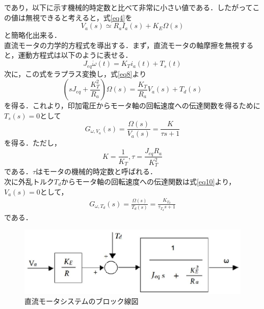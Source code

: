 \documentclass[11pt,a4paper]{jsarticle}
\begin{document}
  であり，以下に示す機械的時定数と比べて非常に小さい値である．したがってこの値は無視できると考えると，式\ref{eq4}を
  \begin{equation}
   V_a(s) \simeq R_a I_a(s) + K_E \Omega(s)
    \label{eq8}
  \end{equation}
  と簡略化出来る．\\
  直流モータの力学的方程式を導出する．まず，直流モータの軸摩擦を無視すると，運動方程式は以下のように表せる．
  \begin{equation}
   J_{eq} \dot{\omega}(t) = K_T i_a(t) + T_s(t) 
    \label{eq9}
  \end{equation}
  次に，この式をラプラス変換し，式\ref{eq8}より
  \begin{equation}
   (sJ_{eq} + \frac{K_T^2}{R_a})\Omega(s) = \frac{K_T}{R_a} V_a(s) + T_d(s)
    \label{eq10}
  \end{equation}
  を得る．これより，印加電圧からモータ軸の回転速度への伝達関数を得るために$T_s(s) = 0$として
  \begin{equation}
   G_{\omega , V_a}(s) = \frac{\Omega(s)}{V_a(s)} = \frac{K}{\tau s+1}
    \label{eq11}
  \end{equation}
  を得る．ただし，
  \begin{equation}
   K = \frac{1}{K_T} , \tau = \frac{J_{eq} R_a}{K_T^2}
    \label{eq12}
  \end{equation}
  である．$\tau$はモータの機械的時定数と呼ばれる．\\
  次に外乱トルク$T_d$からモータ軸の回転速度への伝達関数は式\ref{eq10}より，$V_a(s) = 0$として，
  \begin{eqnarray}
   G_{\omega , T_d}(s) = \frac{\Omega(s)}{T_d(s)} = \frac{K_{T_d}}{\tau_{T_d} s+1}
    \label{eq13}
  \end{eqnarray}
  である．
  \begin{figure}[hbp]
   \begin{center}
    \includegraphics[scale = .8]{./picture/block2.eps}
    \caption{直流モータシステムのブロック線図}
   \end{center}
  \end{figure}
  
\end{document}

